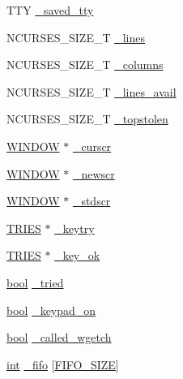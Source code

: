 \begin{DoxyCompactItemize}
T\-T\-Y \hyperlink{structscreen_a1abcfac9f58041523970d54f845d2ec7}{\-\_\-saved\-\_\-tty}
\item 
N\-C\-U\-R\-S\-E\-S\-\_\-\-S\-I\-Z\-E\-\_\-\-T \hyperlink{structscreen_ae5ffcd55c09b5c90f351c2c736a51eef}{\-\_\-lines}
\item 
N\-C\-U\-R\-S\-E\-S\-\_\-\-S\-I\-Z\-E\-\_\-\-T \hyperlink{structscreen_a62f70e1373b1c841f57e38d8b09e9d92}{\-\_\-columns}
\item 
N\-C\-U\-R\-S\-E\-S\-\_\-\-S\-I\-Z\-E\-\_\-\-T \hyperlink{structscreen_a31812f0717b4b6fa79b4273ceee21e4e}{\-\_\-lines\-\_\-avail}
\item 
N\-C\-U\-R\-S\-E\-S\-\_\-\-S\-I\-Z\-E\-\_\-\-T \hyperlink{structscreen_a16718bc21f2b8988d43a45f44e688e26}{\-\_\-topstolen}
\item 
\hyperlink{curses_8priv_8h_aa64cc90e7a4df667d6c7249b77890d39}{W\-I\-N\-D\-O\-W} $\ast$ \hyperlink{structscreen_aa89fe23a8c7bee0f95d97b7936ddba59}{\-\_\-curscr}
\item 
\hyperlink{curses_8priv_8h_aa64cc90e7a4df667d6c7249b77890d39}{W\-I\-N\-D\-O\-W} $\ast$ \hyperlink{structscreen_af1d27499ca7f4b4cec4583db004a8c93}{\-\_\-newscr}
\item 
\hyperlink{curses_8priv_8h_aa64cc90e7a4df667d6c7249b77890d39}{W\-I\-N\-D\-O\-W} $\ast$ \hyperlink{structscreen_a6390bf8e4e9ad37a79aa1c9ead40726e}{\-\_\-stdscr}
\item 
\hyperlink{curses_8priv_8h_a5f6e9f82d8c0189204c13ad4ac5e1c2c}{T\-R\-I\-E\-S} $\ast$ \hyperlink{structscreen_a51df3b371db89025db43f83719930cab}{\-\_\-keytry}
\item 
\hyperlink{curses_8priv_8h_a5f6e9f82d8c0189204c13ad4ac5e1c2c}{T\-R\-I\-E\-S} $\ast$ \hyperlink{structscreen_a0247571cbe76283d8a7afa3958a5c3a0}{\-\_\-key\-\_\-ok}
\item 
\hyperlink{term__entry_8h_a002004ba5d663f149f6c38064926abac}{bool} \hyperlink{structscreen_a1da96d4833f835308d531e3aae1a9f6b}{\-\_\-tried}
\item 
\hyperlink{term__entry_8h_a002004ba5d663f149f6c38064926abac}{bool} \hyperlink{structscreen_acdede6e1f4e9e3f59189a553c8f25dd0}{\-\_\-keypad\-\_\-on}
\item 
\hyperlink{term__entry_8h_a002004ba5d663f149f6c38064926abac}{bool} \hyperlink{structscreen_a80b8c8d054d2021e92be62b3f286f386}{\-\_\-called\-\_\-wgetch}
\item 
\hyperlink{term__entry_8h_ad65b480f8c8270356b45a9890f6499ae}{int} \hyperlink{structscreen_ac08705c6eaeed932efd49cae5ac51407}{\-\_\-fifo} \mbox{[}\hyperlink{curses_8priv_8h_a6092455278a1ac67204e0dbe08f9d13f}{F\-I\-F\-O\-\_\-\-S\-I\-Z\-E}\mbox{]}

\end{DoxyCompactItemize}
